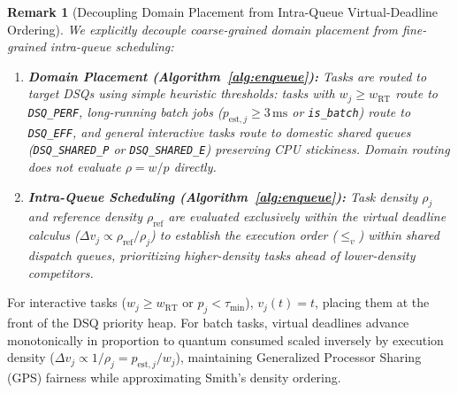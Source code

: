 \documentclass[conference]{IEEEtran}
\newtheorem{remark}{Remark}
\begin{document}
\begin{remark}[Decoupling Domain Placement from Intra-Queue Virtual-Deadline Ordering]
\label{rem:domain_vs_density_theory}
We explicitly decouple coarse-grained domain placement from fine-grained intra-queue scheduling:
\begin{enumerate}
    \item \textbf{Domain Placement (Algorithm~\ref{alg:enqueue}):} Tasks are routed to target DSQs using simple heuristic thresholds: tasks with $w_j \ge w_{\mathrm{RT}}$ route to \texttt{DSQ\_PERF}, long-running batch jobs ($p_{\mathrm{est},j} \ge 3\,\mathrm{ms}$ or \texttt{is\_batch}) route to \texttt{DSQ\_EFF}, and general interactive tasks route to domestic shared queues (\texttt{DSQ\_SHARED\_P} or \texttt{DSQ\_SHARED\_E}) preserving CPU stickiness. Domain routing does not evaluate $\rho = w/p$ directly.
    \item \textbf{Intra-Queue Scheduling (Algorithm~\ref{alg:enqueue}):} Task density $\rho_j$ and reference density $\rho_{\mathrm{ref}}$ are evaluated exclusively within the virtual deadline calculus ($\Delta v_j \propto \rho_{\mathrm{ref}}/\rho_j$) to establish the execution order ($\le_v$) within shared dispatch queues, prioritizing higher-density tasks ahead of lower-density competitors.
\end{enumerate}
\end{remark}

For interactive tasks ($w_j \ge w_{\mathrm{RT}}$ or $p_j < \tau_{\min}$), $v_j(t) = t$, placing them at the front of the DSQ priority heap. For batch tasks, virtual deadlines advance monotonically in proportion to quantum consumed scaled inversely by execution density ($\Delta v_j \propto 1/\rho_j = p_{\mathrm{est},j}/w_j$), maintaining Generalized Processor Sharing (GPS) fairness while approximating Smith's density ordering.
\end{document}
